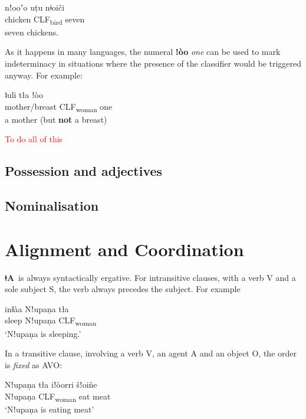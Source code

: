 \documentclass[11pt]{book}
\newcommand{\qcn}[1]{\textbf{#1}}
\newcommand{\langname}{\qcn{ǂA}~}
\newcommand{\transl}[2]{\qcn{#1} \emph{#2}}
\newcommand{\grammsc}[1]{\textsc{#1}}
\newcommand{\CLF}[1]{\grammsc{CLF}\textsubscript{#1}}
\newcommand{\cmnt}[1]{\textcolor{red}{#1}}
\begin{document}
\begin{exe}
\ex
\gll nǃooʼo uṭu nǂoiči\\
chicken \CLF{bird} seven\\
\glt seven chickens.
\end{exe}

As it happens in many languages, the numeral \transl{ǃòo}{one} can be used to mark indeterminacy in situations where the presence of the classifier would be triggered anyway. For example:

\begin{exe}
\ex
\gll ʇuli tła ǃòo\\
mother/breast \CLF{woman} one\\
\glt a mother (but \textbf{not} a breast)
\end{exe}

\cmnt{To do all of this}






\subsection{Possession and adjectives}

\subsection{Nominalisation}

\section{Alignment and Coordination}

\langname is always syntactically ergative. For intransitive clauses, with a verb V and a sole subject S, the verb always precedes the subject. For example

\begin{exe}
	\ex
	\gll inǁàa Nǃupaṇa tła \\
	sleep Nǃupaṇa \CLF{woman}\\
	\glt `Nǃupaṇa is sleeping.'
\end{exe}

In a transitive clause, involving a verb V, an agent A and an object O, the order is \emph{fixed} as AVO:

\begin{exe}
	\ex
	\gll Nǃupaṇa 	tła 	iǃòorri 	šǃoiňe \\
		Nǃupaṇa 	\CLF{woman} 	eat 	meat\\
	\glt `Nǃupaṇa is eating meat'
\end{exe}
\end{document}
